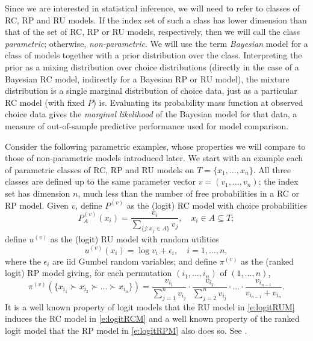 \documentclass[11pt,letter]{article}
\begin{document}
Since we are interested in statistical inference, we will need to refer to classes of RC, RP and RU models.
If the index set of such a class has lower dimension than that of the set of RC, RP or RU models, respectively, then we will call the class {\em parametric}; otherwise, {\em non-parametric}.
We will use the term {\em Bayesian} model for a class of models together with a prior distribution over the class.
Interpreting the prior as a mixing distribution over choice distributions (directly in the case of a Bayesian RC model, indirectly for a Bayesian RP or RU model), the mixture distribution is a single marginal distribution of choice data, just as a particular RC model (with fixed $P$) is.
Evaluating its probability mass function at observed choice data gives the {\em marginal likelihood} of the Bayesian model for that data, a measure of out-of-sample predictive performance used for model comparison.

Consider the following parametric examples, whose properties we will compare to those of non-parametric models introduced later.
We start with an example each of parametric classes of RC, RP and RU models on $T = \{x_1,\ldots,x_n\}$.
All three classes are defined up to the same parameter vector $v = (v_1,\ldots,v_n)$; the index set has dimension $n$, much less than the number of free probabilities in a RC or RP model.
Given $v$, define $P^{(v)}$ as the (logit) RC model with choice probabilities
\begin{equation}\label{e:logitRCM}
  P^{(v)}_A(x_i) = \frac{v_i}{\sum_{\{j \colon x_j \in A\}} v_j}, \quad x_i \in A \subseteq T;
\end{equation}
define $u^{(v)}$ as the (logit) RU model with random utilities
\begin{equation}\label{e:logitRUM}
  u^{(v)}(x_i) = \log v_i + \epsilon_i, \quad i=1,\ldots,n,
\end{equation}
where the $\epsilon_i$ are iid Gumbel random variables;
and define $\pi^{(v)}$ as the (ranked logit) RP model giving, for each permutation $(i_1,\ldots,i_n)$ of $(1,\ldots,n)$,
\begin{equation}\label{e:logitRPM}
  \pi^{(v)}(\{x_{i_1} \succ x_{i_2} \succ \ldots \succ x_{i_n}\}) =
  \frac{v_{i_1}}{\sum_{j=1}^n v_{i_j}} \cdot
  \frac{v_{i_2}}{\sum_{j=2}^n v_{i_j}} \cdot \ldots \cdot
  \frac{v_{i_{n-1}}}{v_{i_{n-1}} + v_{i_n}}.
\end{equation}
It is a well known property of logit models that the RU model in \eqref{e:logitRUM} induces the RC model in \eqref{e:logitRCM} and a well known property of the ranked logit model that the RP model in \eqref{e:logitRPM} also does so.
See .
\end{document}
